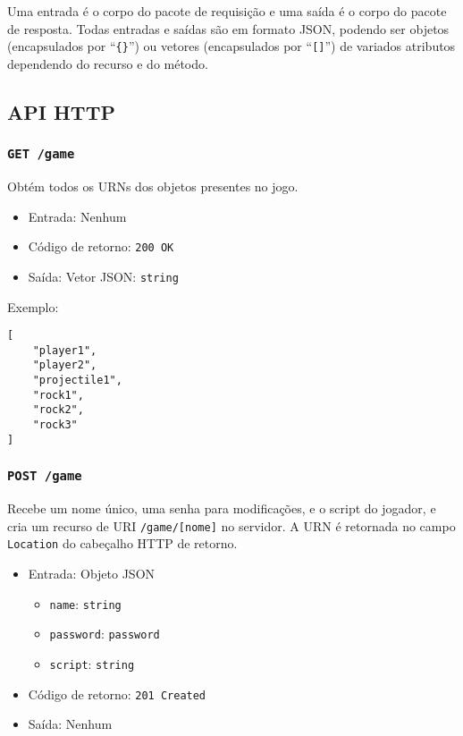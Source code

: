 \documentclass[12pt,a4paper]{article}
\begin{document}
Uma entrada é o corpo do pacote de requisição e uma saída é o corpo do pacote
de resposta. Todas entradas e saídas são em formato JSON, podendo ser objetos
(encapsulados por ``\texttt{\{\}}'') ou vetores (encapsulados por
``\texttt{[]}'') de variados atributos dependendo do recurso e do método.

\subsection{API HTTP}

\subsubsection{\texttt{GET /game}}

Obtém todos os URNs dos objetos presentes no jogo.

\begin{itemize}
	\item Entrada: Nenhum
	\item Código de retorno: \texttt{200 OK}
	\item Saída: Vetor JSON: \texttt{string}
\end{itemize}

Exemplo:

\begin{verbatim}
[
    "player1",
    "player2",
    "projectile1",
    "rock1",
    "rock2",
    "rock3"
]
\end{verbatim}

\subsubsection{\texttt{POST /game}}

Recebe um nome único, uma senha para modificações, e o script do jogador, e
cria um recurso de URI \texttt{/game/[nome]} no servidor. A URN é retornada no
campo \texttt{Location} do cabeçalho HTTP de retorno.

\begin{itemize}
	\item Entrada: Objeto JSON
		\begin{itemize}
			\item \texttt{name}: \texttt{string}
			\item \texttt{password}: \texttt{password}
			\item \texttt{script}: \texttt{string}
		\end{itemize}
	\item Código de retorno: \texttt{201 Created}
	\item Saída: Nenhum
\end{itemize}
\end{document}
